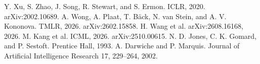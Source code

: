 \markdownRendererDocumentBegin
\markdownRendererSectionBegin
{}\markdownRendererInterblockSeparator
{}\markdownRendererOlBeginTight
{}Y. Xu, S. Zhao, J. Song, R. Stewart, and S. Ermon.  ICLR, 2020. arXiv:2002.10689.\markdownRendererOlItemEnd 
{}A. Wong, A. Plaat, T. Bäck, N. van Stein, and A. V. Kononova.  TMLR, 2026. arXiv:2602.15858.\markdownRendererOlItemEnd 
{}H. Wang et al.  arXiv:2608.16168, 2026.\markdownRendererOlItemEnd 
{}M. Kang et al.  ICML, 2026. arXiv:2510.00615.\markdownRendererOlItemEnd 
{}N. D. Jones, C. K. Gomard, and P. Sestoft.  Prentice Hall, 1993.\markdownRendererOlItemEnd 
{}A. Darwiche and P. Marquis.  Journal of Artificial Intelligence Research 17, 229–264, 2002.\markdownRendererOlItemEnd 
\markdownRendererOlEndTight 
\markdownRendererSectionEnd \markdownRendererDocumentEnd